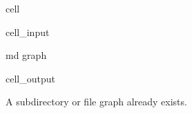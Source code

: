 \documentclass[letterpaper,10pt,english]{jupyterBook}
\begin{document}
\begin{sphinxuseclass}{cell}\begin{sphinxVerbatimInput}

\begin{sphinxuseclass}{cell_input}
\begin{sphinxVerbatim}[commandchars=\\\{\}]
md graph
\end{sphinxVerbatim}

\end{sphinxuseclass}\end{sphinxVerbatimInput}
\begin{sphinxVerbatimOutput}

\begin{sphinxuseclass}{cell_output}
\begin{sphinxVerbatim}[commandchars=\\\{\}]
A subdirectory or file graph already exists.
\end{sphinxVerbatim}

\end{sphinxuseclass}\end{sphinxVerbatimOutput}

\end{sphinxuseclass}
\end{document}
